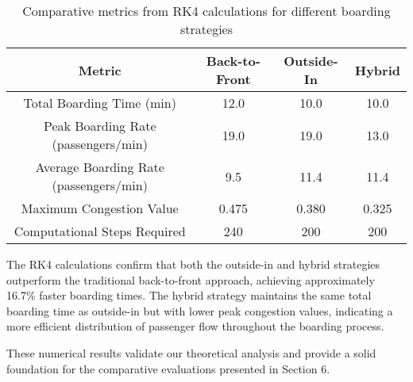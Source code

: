 \begin{table}[h]
\centering
\begin{tabular}{|c|c|c|c|}
\hline
\textbf{Metric} & \textbf{Back-to-Front} & \textbf{Outside-In} & \textbf{Hybrid} \\
\hline
Total Boarding Time (min) & 12.0 & 10.0 & 10.0 \\
\hline
Peak Boarding Rate (passengers/min) & 19.0 & 19.0 & 13.0 \\
\hline
Average Boarding Rate (passengers/min) & 9.5 & 11.4 & 11.4 \\
\hline
Maximum Congestion Value & 0.475 & 0.380 & 0.325 \\
\hline
Computational Steps Required & 240 & 200 & 200 \\
\hline
\end{tabular}
\caption{Comparative metrics from RK4 calculations for different boarding strategies}
\label{tab:rk4_comparison}
\end{table}

The RK4 calculations confirm that both the outside-in and hybrid strategies outperform the traditional back-to-front approach, achieving approximately 16.7\% faster boarding times. The hybrid strategy maintains the same total boarding time as outside-in but with lower peak congestion values, indicating a more efficient distribution of passenger flow throughout the boarding process.

These numerical results validate our theoretical analysis and provide a solid foundation for the comparative evaluations presented in Section 6.
